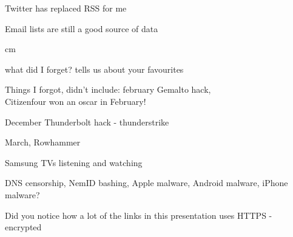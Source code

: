 \documentclass[20pt,landscape,a4paper,footrule]{foils}
\begin{document}
{\small{}}





\begin{list1}
\item Twitter has replaced RSS for me
\item Email lists are still a good source of data
\end{list1}




 cm

\centerline{\Large what did I forget? tells us about your favourites \smiley}

Things I forgot, didn't include: february Gemalto hack,\\
Citizenfour won an oscar in February!

December Thunderbolt hack - thunderstrike

March, Rowhammer\\
{\small{}}

Samsung TVs listening and watching

DNS censorship, NemID bashing, Apple malware, Android malware, iPhone malware?

Did you notice how a lot of the links in this presentation uses HTTPS - encrypted

\myquestionspage
\end{document}
